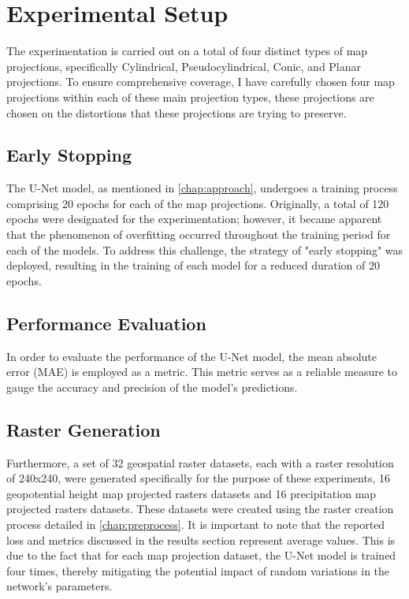 \section{Experimental Setup}
The experimentation is carried out on a total of four distinct types of map projections, specifically Cylindrical, Pseudocylindrical, Conic, and Planar projections.
To ensure comprehensive coverage, I have carefully chosen four map projections within each of these main projection types, these projections are chosen on the distortions that these projections are trying to preserve.

\subsection{Early Stopping}
The U-Net model, as mentioned in \autoref{chap:approach}, undergoes a training process comprising 20 epochs for each of the map projections.
Originally, a total of 120 epochs were designated for the experimentation; however, it became apparent that the phenomenon of overfitting occurred throughout the
training period for each of the models. To address this challenge, the strategy of "early stopping" was deployed, resulting in the training of each model for a reduced
duration of 20 epochs.

\subsection{Performance Evaluation}
In order to evaluate the performance of the U-Net model, the mean absolute error (MAE) is employed as a metric. This metric serves as a reliable measure to gauge
the accuracy and precision of the model's predictions.
\subsection{Raster Generation}
Furthermore, a set of 32 geospatial raster datasets, each with a raster resolution of 240x240, were generated specifically for the purpose of these experiments, 16 geopotential height map projected rasters datasets and 16 precipitation map projected rasters datasets.
These datasets were created using the raster creation process detailed in \autoref{chap:preprocess}.
It is important to note that the reported loss and metrics discussed
in the results section represent average values. This is due to the fact that for each map projection dataset, the U-Net model is trained four times, thereby mitigating
the potential impact of random variations in the network's parameters.

